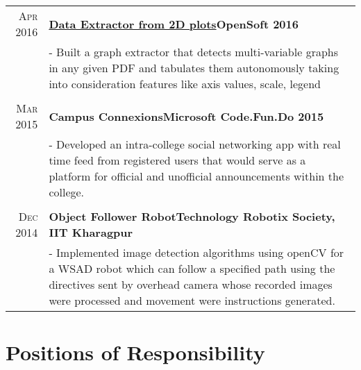 \documentclass[a4paper,10pt]{extarticle} %
\begin{document}
\begin{tabular}{r|p{17cm}}

\textsc{Apr 2016} & \textbf{\href{https://github.com/ghostwriternr/Opensoft-2016}{Data Extractor from 2D plots}}\hfill\textbf{OpenSoft 2016}\\
& \footnotesize{- Built a graph extractor that detects multi-variable graphs in any given PDF and tabulates them autonomously taking into consideration features like axis values, scale, legend}\\
\multicolumn{2}{c}{} \\

\textsc{Mar 2015} & \textbf{Campus Connexions}\hfill\textbf{Microsoft Code.Fun.Do 2015}\\
& \footnotesize{- Developed an intra-college social networking app with real time feed from registered users that would serve as a platform for official and unofficial announcements within the college.}\\
\multicolumn{2}{c}{} \\

\textsc{Dec 2014} & \textbf{Object Follower Robot}\hfill\textbf{Technology Robotix Society, IIT Kharagpur}\\
& \footnotesize{- Implemented image detection algorithms using openCV for a WSAD robot which can follow a specified path using the directives sent by overhead camera whose recorded images were processed and movement were instructions generated.}
\end{tabular}


\section{Positions of Responsibility}
\end{document}
